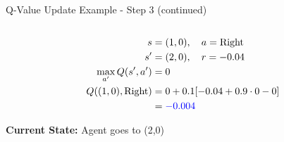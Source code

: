 \documentclass[aspectratio=169]{beamer}
\begin{document}
\begin{frame}{Q-Value Update Example - Step 3 (continued)}
\begin{columns}
        \begin{column}{0.5\textwidth}
            
            \begin{align}
                s &= (1,0), \quad a = \text{Right} \\
                s' &= (2,0), \quad r = -0.04 \\
                \max_{a'}Q(s',a') &= 0 \\
                Q((1,0),\text{Right}) &= 0 + 0.1[-0.04 + 0.9 \cdot 0 - 0] \\
                &= \textcolor{blue}{-0.004}
            \end{align}
            
            \vspace{0.5cm}
            \textbf{Current State:} Agent goes to (2,0)
        \end{column}
    \end{columns}
\end{frame}
\end{document}
